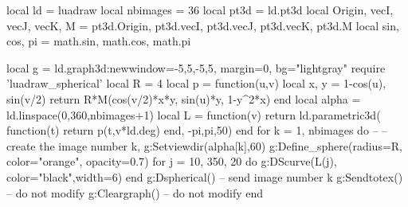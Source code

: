 \documentclass[tikz]{standalone} %
\begin{document}
\begin{luacode*}
local ld = luadraw
local nbimages = 36
local pt3d = ld.pt3d
local Origin, vecI, vecJ, vecK, M = pt3d.Origin, pt3d.vecI, pt3d.vecJ, pt3d.vecK, pt3d.M
local sin, cos, pi = math.sin, math.cos, math.pi

local g = ld.graph3d:new{window={-5,5,-5,5}, margin=0, bg="lightgray"}
require 'luadraw_spherical'
local R = 4
local p = function(u,v)
    local x, y = 1-cos(u), sin(v/2)
    return R*M(cos(v/2)*x*y, sin(u)*y, 1-y^2*x)
end
local alpha = ld.linspace(0,360,nbimages+1)
local L = function(v) 
    return ld.parametric3d( function(t) return p(t,v*ld.deg) end, -pi,pi,50)
end
for k = 1, nbimages do  -- -- create the image number k,
    g:Setviewdir(alpha[k],60)
    g:Define_sphere({radius=R, color="orange", opacity=0.7})
    for j = 10, 350, 20 do
        g:DScurve(L(j), {color="black",width=6})
    end
    g:Dspherical()
    -- send image number k
    g:Sendtotex()  -- do not modify
    g:Cleargraph() -- do not modify
end
\end{luacode*}
\end{document}
